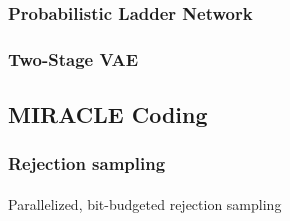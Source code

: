 \documentclass{article}
\begin{document}

\subsubsection{Probabilistic Ladder Network}
\paragraph{}

\subsubsection{Two-Stage VAE}
\paragraph{}
\cite{dai2019diagnosing}

\subsection{MIRACLE Coding}
\label{sec:mir_coding}
\paragraph{}
\cite{havasi2018minimal}

\subsubsection{Rejection sampling}
\paragraph{}
\cite{harsha2007communication}


\begin{algorithm}
  \caption{Parallelized, bit-budgeted rejection sampling}
  \label{alg:multivariate_rej_samp}
  \begin{algorithmic}
    \State
    \EndProcedure
  \end{algorithmic}
\end{algorithm}
\end{document}

